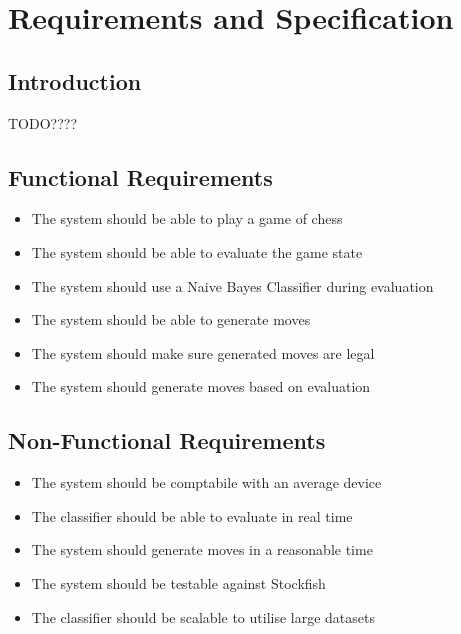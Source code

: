 \chapter{Requirements and Specification}

\section{Introduction}
TODO????

\section{Functional Requirements}
\begin{itemize}
    \item The system should be able to play a game of chess
    \item The system should be able to evaluate the game state
    \item The system should use a Naive Bayes Classifier during evaluation
    \item The system should be able to generate moves
    \item The system should make sure generated moves are legal
    \item The system should generate moves based on evaluation
\end{itemize}

\section{Non-Functional Requirements}
\begin{itemize}
    \item The system should be comptabile with an average device
    \item The classifier should be able to evaluate in real time
    \item The system should generate moves in a reasonable time
    \item The system should be testable against Stockfish
    \item The classifier should be scalable to utilise large datasets
\end{itemize}